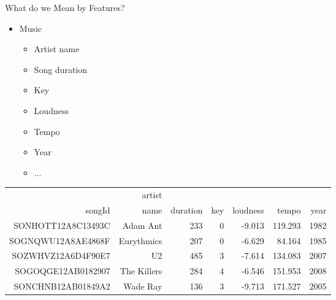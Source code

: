 \documentclass[aspectratio=169]{beamer}
\begin{document}
\begin{frame}{What do we Mean by Features?}

\begin{itemize}
\item Music
	\begin{itemize}
	\item Artist name
	\item Song duration
	\item Key
	\item Loudness
	\item Tempo
	\item Year
	\item $\ldots$
	\end{itemize}
\end{itemize}
{\tiny
\begin {table}[H]
\begin{tabular}{|r|r|r|r|r|r|r|}
\hline
& 	artist &  &   &  &  &   \\ 
 songId & name &  duration & key &  loudness & tempo & year   \\ \hline \hline
SONHOTT12A8C13493C  & Adam Ant & 233 & 0  & -9.013 & 119.293 & 1982 \\ \hline
SOGNQWU12A8AE4868F  & Eurythmics & 207 & 0  & -6.629 & 84.164 & 1985 \\ \hline
SOZWHVZ12A6D4F90E7  & U2 & 485 & 3  & -7.614 & 134.083 & 2007 \\ \hline
SOGOQGE12AB0182907  & The Killers & 284 & 4  & -6.546	 & 151.953 & 2008 \\ \hline
SONCHNB12AB01849A2  & Wade Ray & 136  & 3  & -9.713	 & 171.527& 2005 \\ \hline

\end{tabular}
\end{table}
}
\end{frame}
\end{document}
